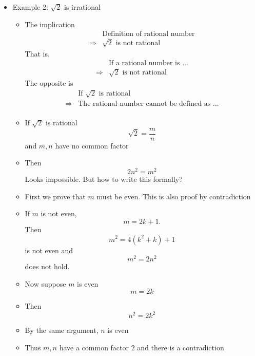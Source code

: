 \begin{frame}[allowframebreaks]
\begin{itemize}
\item Example 2: $\sqrt{2}$ is irrational
  \begin{itemize}
  \item The implication
    \begin{equation*}
      \begin{split}
&   \text{Definition of rational number}\\
\Rightarrow&  \sqrt{2} \text{ is not rational}
\end{split}
\end{equation*}
That is,
    \begin{equation*}
      \begin{split}
&   \text{If a rational number is ...}\\
\Rightarrow&  \sqrt{2} \text{ is not rational}
\end{split}
\end{equation*}
The opposite is
    \begin{equation*}
      \begin{split}
        &  \text{If $\sqrt{2}$ is rational}
\\
\Rightarrow& \text{The rational number cannot be defined as ...}\\
\end{split}
\end{equation*}
  \item If $\sqrt{2}$ is rational
    \begin{equation*}
      \sqrt{2}=\frac{m}{n}
    \end{equation*}
    and
    $m,n$ have no common factor
  \item Then
    \begin{equation*}
      2n^2=m^2
    \end{equation*}
Looks impossible. But how to write this formally?
\item First we prove that $m$ must be even. This is also proof by
  contradiction
\item [] If $m$ is not even, 
  \begin{equation*}
    m = 2k + 1.
  \end{equation*}
Then
\begin{equation*}
  m^2 = 4(k^2 + k) + 1
\end{equation*}
is not even and
\begin{equation*}
  m^2 = 2n^2
\end{equation*}
does not hold.
\item Now suppose $m$ is even
  $$m=2k$$
\item [] Then
  \begin{equation*}
    n^2 = 2k^2
  \end{equation*}
\item By the same argument, $n$ is even
\item Thus $m, n$ have a common factor $2$ and there
is a contradiction
  \end{itemize}

\end{itemize}\end{frame}



